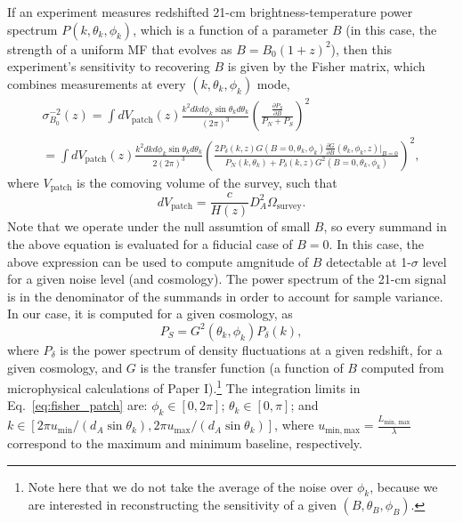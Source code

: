 \documentclass[12pt]{paper}
\begin{document}
If an experiment measures redshifted 21-cm brightness-temperature power spectrum $P(k,\theta_k,\phi_k)$, which is a function of a parameter $B$ (in this case, the strength of a uniform MF that evolves as $B=B_0(1+z)^2$), then this experiment's sensitivity to recovering $B$ is given by the Fisher matrix, which combines measurements at every $(k,\theta_k,\phi_k)$ mode,
\begin{equation}
\begin{gathered}
\sigma_{B_0}^{-2}(z) = \int dV_\mathrm{patch}(z)
\frac{k^2dk d\phi_k\sin \theta_kd\theta_k}{(2\pi)^3}\left(  \frac{\frac{\partial P_S}{\partial B}}{P_N + P_S }\right)^2 \\
=\int dV_\mathrm{patch}(z)
\frac{k^2dk d\phi_k\sin \theta_kd\theta_k}{2(2\pi)^3}\left( \frac{2P_\delta(k,z)G(B=0,\theta_k,\phi_k)\frac{\partial G}{\partial B}(\theta_k, \phi_k,z)\bigg|_{B=0}}{P_N(k,\theta_k) + P_\delta(k,z)G^2(B=0,\theta_k,\phi_k)} \right)^2,
\end{gathered}
\label{eq:fisher_patch}
\end{equation}
where $V_\mathrm{patch}$ is the comoving volume of the survey, such that
\begin{equation}
dV_\mathrm{patch} = \frac{c}{H(z)}D_A^2\Omega_\mathrm{survey}.
\end{equation}
Note that we operate under the null assumtion of small $B$, so every summand in the above equation is evaluated for a fiducial case of $B=0$. In this case, the above expression can be used to compute amgnitude of $B$ detectable at 1-$\sigma$ level for a given noise level (and cosmology). The power spectrum of the 21-cm signal is in the denominator of the summands in order to account for sample variance. In our case, it is computed for a given cosmology, as
\begin{equation}
P_S = G^2(\theta_k, \phi_k) P_\delta (k),
\label{eq:PS}
\end{equation}
where $P_\delta$ is the power spectrum of density fluctuations at a given redshift, for a given cosmology, and $G$ is the transfer function (a function of $B$ computed from microphysical calculations of Paper I).\footnote{Note here that we do not take the average of the noise over $\phi_k$, because we are interested in reconstructing the sensitivity of a given $(B,\theta_B,\phi_B)$. }
The integration limits in Eq.~\ref{eq:fisher_patch} are: $\phi_k\in[0,2\pi]$; $\theta_k\in [0,\pi]$; and $k\in[2\pi u_\mathrm{min}/(d_A\sin\theta_k),2\pi u_\mathrm{max}/(d_A\sin\theta_k)]$, where $u_\mathrm{min, max}=\frac{L_\text{min, max}}{\lambda}$ correspond to the maximum and minimum baseline, respectively.
\end{document}
